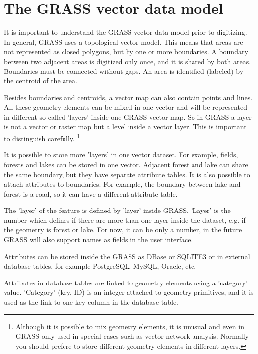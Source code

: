 \section{The GRASS vector data model}\label{label_vectmodel}

It is important to understand the GRASS vector data model prior to
digitizing. In general, GRASS uses a topological
vector model. This means that areas are not represented
as closed polygons, but by one or more boundaries. A boundary between two
adjacent areas is digitized only once, and it is shared by both areas.
Boundaries must be connected without gaps. An area is identified (labeled)
by the centroid of the area.

Besides boundaries and centroids, a vector map can also contain
points and lines. All these geometry elements can be mixed
in one vector and will be represented in different so called 'layers' inside
one GRASS vector map. So in GRASS a layer is not a vector or raster map but a
level inside a vector layer. This is important to distinguish carefully.
\footnote{Although it
is possible to mix geometry elements, it is unusual and even in GRASS only
used in special cases such as vector network analysis. Normally you should
prefere to store different geometry elements in different layers.}

It is possible to store more 'layers' in one vector dataset. For example,
fields, forests and lakes can be stored in one vector. Adjacent
forest and lake can share the same boundary, but they have separate attribute
tables. It is also possible to attach attributes to boundaries. For example,
the boundary between lake and forest is a road, so it can have a different
attribute table.

The 'layer' of the feature is defined by 'layer' inside GRASS. 'Layer' is the
number which defines if there are more than one layer inside the dataset, e.g.
if the geometry is forest or lake. For now, it can be only a number, in the
future GRASS will also support names as fields in the user interface.

Attributes can be stored inside the GRASS  as DBase or
SQLITE3 or in external database tables, for example PostgreSQL, MySQL,
Oracle, etc.

Attributes in database tables are linked to geometry elements using
a 'category' value. 'Category' (key, ID) is an
integer attached to geometry primitives, and it is used as the link to one
key column in the database table.

